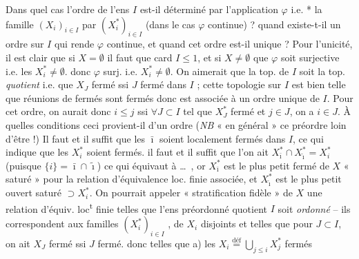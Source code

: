\documentclass[11pt,a4paper]{article}
\begin{document}


Dans quel cas l'ordre de l'ens $I$ est-il déterminé par l'application $\varphi$ i.e. *  la famille $(X_i)_{i\in I}$ \struck{\ill{}}  par $(X_i^{*})_{i\in I}$ (dans le cas $\varphi$ continue) ? quand \struck{\ill{}} existe-t-il un ordre sur $I$ qui rende $\varphi$ continue, et quand cet ordre est-il unique ? Pour l'unicité, il est clair que si $X=\emptyset$ il faut que card $I\le 1$, et si $X\neq\emptyset$ que $\varphi$ soit surjective i.e. les $X_i^{*}\neq\emptyset$.   donc $\varphi$ surj. i.e. $X_i^{*}\neq\emptyset$. On aimerait que la top. de $I$ soit la top. \emph{quotient} i.e. que $X_J$ fermé ssi $J$ fermé dans $I$ ; cette topologie sur $I$ est bien telle que  réunions de fermés  sont fermés donc est associée à un ordre unique de $I$. Pour cet ordre, on aurait donc $i\le j$ ssi \struck{\ill{}} $\forall J\subset I$ tel que $X_J^{*}$ fermé et $j\in J$, on a $i\in J$. À quelles conditions ceci provient-il d'un ordre (\emph{NB} « en général » ce préordre  loin d'être  !) Il faut et il suffit que les $\bar\imath$ soient localement fermés dans $I$, ce qui indique que les $X_i^{*}$ soient  fermés. \struck{\ill{}} \struck{\ill{}}  il faut et il suffit que \add{\uncertain{\ill{}}} l'on ait \struck{\ill{}} $X_{\bar\imath}^{*}\cap X_{\tilde\imath}^{*}=X_i^{*}$ (puisque $\lbrace i\rbrace=\bar\imath\cap\tilde\imath$) ce qui équivaut à \struck{\ill{}} \ldots\ , or $X_{\bar\imath}^{*}$ est le plus petit fermé de $X$ « saturé » pour la relation d'équivalence loc. finie associée, et $X_{\tilde\imath}^{*}$ est le plus petit ouvert saturé $\supset X_i^{*}$. On pourrait appeler « stratification fidèle » de $X$ une relation d'équiv. loc\textsuperscript{t} finie telles que l'ens préordonné quotient $I$ soit \emph{ordonné} -- ils correspondent aux familles  \struck{\ill{}} $(X_i^{*})_{i\in I}$ ,  de $X_i$ \struck{\ill{}} disjoints et telles que pour $J\subset I$, on ait $X_J$ fermé ssi $J$ fermé. donc telles que a) les $X_i\overset{\text{déf}}{=}\bigcup_{j\le i}X_j^{*}$ fermés 
\end{document}
